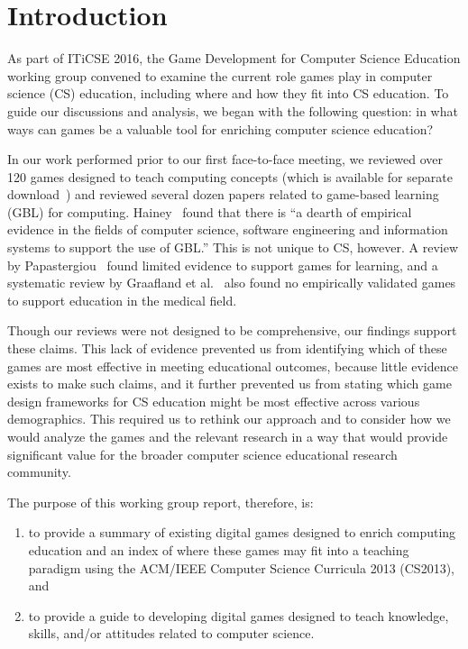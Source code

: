 \documentclass{sig-alternate-05-2015}
\begin{document}
\section{Introduction}


As part of ITiCSE 2016, the Game Development for Computer Science Education working group convened to examine the current role games play in computer science (CS) education, including where and how they fit into CS education. To guide our discussions and analysis, we began with the following question: in what ways can games be a valuable tool for enriching computer science education?



In our work performed prior to our first face-to-face meeting, we reviewed over 120 games designed to teach computing concepts (which is available for separate download~\cite{appendix}) and reviewed several dozen papers related to game-based learning (GBL) for computing. Hainey~\cite{hainey2010using} found that there is ``a dearth of empirical evidence in the fields of computer science, software engineering and information systems to support the use of GBL.'' This is not unique to CS, however. A review by Papastergiou~\cite{papastergiou2009digital} found limited evidence to support games for learning, and a systematic review by Graafland et al.~\cite{graafland2012systematic} also found no empirically validated games to support education in the medical field.



Though our reviews were not designed to be comprehensive, our findings support these claims. This lack of evidence prevented us from identifying which of these games are most effective in meeting educational outcomes, because little evidence exists to make such claims, and it further prevented us from stating which game design frameworks for CS education might be most effective across various demographics. This required us to rethink our approach and to consider how we would analyze the games and the relevant research in a way that would provide significant value for the broader computer science educational research community. 



The purpose of this working group report, therefore, is: 

\begin{enumerate}
\setcounter{enumi}{0}
\item to provide a summary of existing digital games designed to enrich computing education and an index of where these games may fit into a teaching paradigm using the ACM/IEEE Computer Science Curricula 2013 (CS2013), and 
\item to provide a guide to developing digital games designed to teach knowledge, skills, and/or attitudes related to computer science.
\end{enumerate}
\end{document}
